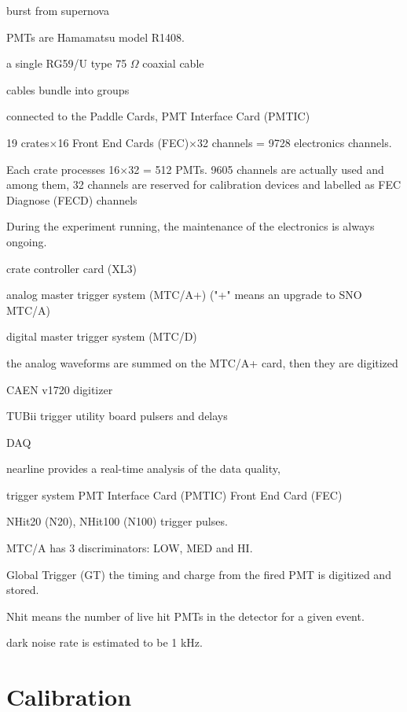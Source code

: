 burst 
from supernova


PMTs are Hamamatsu model R1408.


a single RG59/U type 75 $\Omega$ coaxial cable


cables bundle into groups

connected to the Paddle Cards, 
PMT Interface Card (PMTIC) 
\cite{andyElectronics}

19 crates$\times$16 Front End Cards (FEC)$\times$32 channels = 9728 electronics channels.





Each crate processes 16$\times$32 = 512 PMTs.
9605 channels are actually used and among them, 32 channels are reserved for calibration devices and labelled as FEC Diagnose (FECD) channels


During the experiment running, the maintenance of the electronics is always ongoing.

crate controller card (XL3)


analog master trigger system (MTC/A+) 
("+" means an upgrade to SNO MTC/A)


digital master trigger system (MTC/D)

the analog waveforms are summed on the MTC/A+ card, then they are digitized 

CAEN v1720 digitizer 

TUBii trigger utility board 
pulsers and delays

DAQ 


nearline provides a real-time analysis of the data quality, 

trigger system
PMT Interface Card (PMTIC)
Front End Card (FEC)

NHit20 (N20), NHit100 (N100) trigger pulses.

MTC/A has 3 discriminators: LOW, MED and HI.

Global Trigger (GT)
the timing and charge from the fired PMT is digitized and stored.




Nhit means the number of live hit PMTs in the detector for a given event.


dark noise rate is estimated to be 1 kHz.










\section{Calibration}


